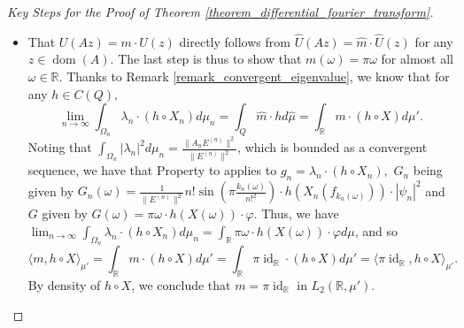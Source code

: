 \documentclass[10pt,a4paper]{amsart}
\def \Dom{\operatorname{dom}}
\def \Id{\operatorname{id}}
\def \HMU{\hat{\mu}}
\def \HU{\hat{U}}
\def \Hm{\hat{m}}
\def \LL{\langle}
\def \RR{\rangle}
\begin{document}
\begin{proof}[Key Steps for the Proof of Theorem \ref{theorem_differential_fourier_transform}]
\begin{itemize}
		\item That $U(Az)=m\cdot U(z)$ directly follows from $\HU(Az)=\Hm\cdot\HU(z)$ for any $z\in\Dom(A).$ The last step is thus to show that $m(\omega)=\pi\omega$ for almost all $\omega\in\mathbb{R}.$ Thanks to Remark \ref{remark_convergent_eigenvalue}, we know that for any $h\in C(Q),$ $$\lim_{n\rightarrow\infty} \int_{\Omega_n}\lambda_n\cdot (h\circ X_n)d\mu_n=\int_Q \Hm\cdot hd\HMU=\int_{\mathbb{R}}m\cdot (h\circ X) d\mu'.$$ Noting that $\int_{\Omega_n}|\lambda_n|^2d\mu_n=\frac{\|A_n E^{(n)}\|^2}{\|E^{(n)}\|^2}$, which is bounded as a convergent sequence, we have that Property to applies to $g_n=\lambda_n\cdot (h\circ X_n),$ $G_n$ being given by $G_n(\omega)=\frac{1}{\|E^{(n)}\|^2}n! \sin(\pi\frac{k_n(\omega)}{n!^2})\cdot h(X_n(f_{k_n(\omega)}))\cdot|\psi_n|^2$ and $G$ given by $G(\omega)=\pi\omega \cdot h(X(\omega))\cdot\varphi.$ Thus, we have $\lim_{n\rightarrow\infty} \int_{\Omega_n}\lambda_n\cdot (h\circ X_n)d\mu_n=\int_{\mathbb{R}}\pi\omega\cdot h(X(\omega))\cdot\varphi d\mu$, and so $$\LL m, h\circ X\RR_{\mu'}=\int_{\mathbb{R}}m\cdot (h\circ X) d\mu'=\int_{\mathbb{R}}\pi\Id_{\mathbb{R}}\cdot (h\circ X)d\mu'=\LL \pi\Id_{\mathbb{R}}, h\circ X \RR_{\mu'}. $$ By density of $h\circ X$, we conclude that $m=\pi\Id_{\mathbb{R}}$ in $L_2(\mathbb{R},\mu').$%
	\end{itemize}
\end{proof}
\end{document}
